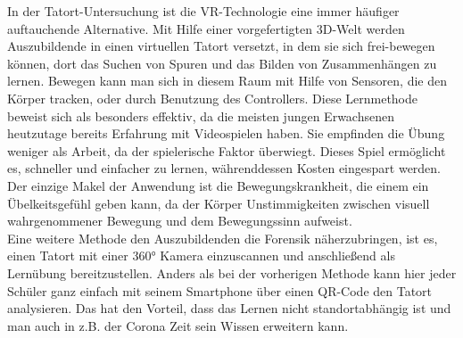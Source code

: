 In der Tatort-Untersuchung ist die VR-Technologie eine immer häufiger auftauchende Alternative. Mit Hilfe einer vorgefertigten 3D-Welt werden Auszubildende in einen virtuellen Tatort versetzt, in dem sie sich frei-bewegen können, dort das Suchen von Spuren und das Bilden von Zusammenhängen zu lernen. Bewegen kann man sich in diesem Raum mit Hilfe von Sensoren, die den Körper tracken, oder durch Benutzung des Controllers. Diese Lernmethode beweist sich als besonders effektiv, da die meisten jungen Erwachsenen heutzutage bereits Erfahrung mit Videospielen haben. Sie empfinden die Übung weniger als Arbeit, da der spielerische Faktor überwiegt. Dieses Spiel ermöglicht es, schneller und einfacher zu lernen, währenddessen Kosten eingespart werden. Der einzige Makel der Anwendung ist die Bewegungskrankheit, die einem ein Übelkeitsgefühl geben kann, da der Körper Unstimmigkeiten zwischen visuell wahrgenommener Bewegung und dem Bewegungssinn aufweist.
\\
Eine weitere Methode den Auszubildenden die Forensik näherzubringen, ist es, einen Tatort mit einer 360° Kamera einzuscannen und anschließend als Lernübung bereitzustellen. Anders als bei der vorherigen Methode kann hier jeder Schüler ganz einfach mit seinem Smartphone über einen QR-Code den Tatort analysieren. Das hat den Vorteil, dass das Lernen nicht standortabhängig ist und man auch in z.B. der Corona Zeit sein Wissen erweitern kann. 
